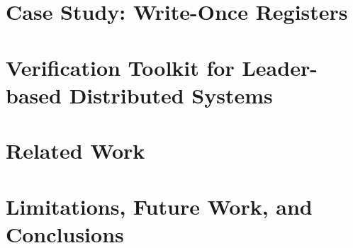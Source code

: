 \documentclass[letterpaper,11pt]{yalephd}
\begin{document}
\chapter{Case Study: Write-Once Registers}
\label{chapter:wormspace}






\chapter{Verification Toolkit for Leader-based Distributed Systems }
\label{chapter:witness-passing}











\chapter{Related Work} 
\label{chapter:related}


\chapter{Limitations, Future Work, and Conclusions}
\label{chapter:conclusion}


\backmatter


\end{document}
